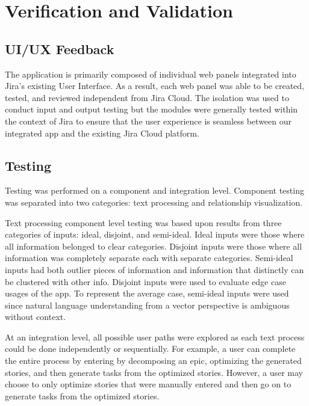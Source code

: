 \section{Verification and Validation}

\subsection{UI/UX Feedback}

The application is primarily composed of individual web panels integrated into Jira’s existing User Interface. As a result, each web panel was able to be created, tested, and reviewed independent from Jira Cloud. The isolation was used to conduct input and output testing but the modules were generally tested within the context of Jira to ensure that the user experience is seamless between our integrated app and the existing Jira Cloud platform.

\subsection{Testing}

Testing was performed on a component and integration level. Component testing was separated into two categories: text processing and relationship visualization.

Text processing component level testing was based upon results from three categories of inputs: ideal, disjoint, and semi-ideal. Ideal inputs were those where all information belonged to clear categories. Disjoint inputs were those where all information was completely separate each with separate categories. Semi-ideal inputs had both outlier pieces of information and information that distinctly can be clustered with other info. Disjoint inputs were used to evaluate edge case usages of the app. To represent the average case, semi-ideal inputs were used since natural language understanding from a vector perspective is ambiguous without context.

At an integration level, all possible user paths were explored as each text process could be done independently or sequentially. For example, a user can complete the entire process by entering by decomposing an epic, optimizing the generated stories, and then generate tasks from the optimized stories. However, a user may choose to only optimize stories that were manually entered and then go on to generate tasks from the optimized stories. 
